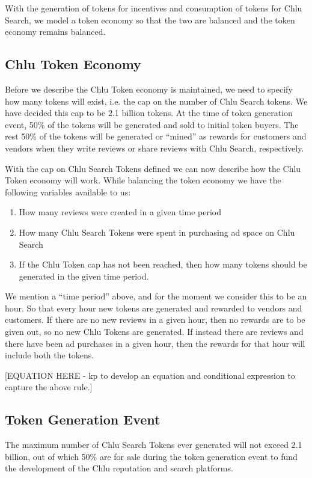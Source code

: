 \documentclass[a4paper]{article}
\begin{document}
With the generation of tokens for incentives and consumption of tokens
for Chlu Search, we model a token economy so that the two are balanced
and the token economy remains balanced.

\subsection{Chlu Token Economy}

Before we describe the Chlu Token economy is maintained, we need to
specify how many tokens will exist, i.e. the cap on the number of Chlu
Search tokens. We have decided this cap to be 2.1 billion tokens. At
the time of token generation event, 50\% of the tokens will be
generated and sold to initial token buyers. The rest 50\% of the
tokens will be generated or ``mined'' as rewards for customers and
vendors when they write reviews or share reviews with Chlu Search,
respectively.

With the cap on Chlu Search Tokens defined we can now describe how the
Chlu Token economy will work. While balancing the token economy we
have the following variables available to us:

\begin{enumerate}
\item How many reviews were created in a given time period
\item How many Chlu Search Tokens were spent in purchasing ad space on
  Chlu Search
\item If the Chlu Token cap has not been reached, then how many tokens
  should be generated in the given time period.
\end{enumerate}

We mention a ``time period'' above, and for the moment we consider
this to be an hour. So that every hour new tokens are generated and
rewarded to vendors and customers. If there are no new reviews in a
given hour, then no rewards are to be given out, so no new Chlu Tokens
are generated. If instead there are reviews and there have been ad
purchases in a given hour, then the rewards for that hour will include
both the tokens.

[EQUATION HERE - kp to develop an equation and conditional expression
  to capture the above rule.]

\subsection{Token Generation Event}

The maximum number of Chlu Search Tokens ever generated will not
exceed 2.1 billion, out of which 50\% are for sale during the token
generation event to fund the development of the Chlu reputation and
search platforms.
\end{document}
